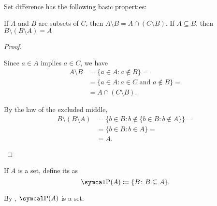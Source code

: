 \begin{proposition}\label{thm:set_difference_properties}
  Set difference has the following basic properties:
  \begin{propenum}
     If \( A \) and \( B \) are subsets of \( C \), then \( A \setminus B = A \cap (C \setminus B) \).
     If \( A \subseteq B \), then \( B \setminus (B \setminus A) = A \)
  \end{propenum}
\end{proposition}
\begin{proof}\mbox{}
  \begin{description}
     Since \( a \in A \) implies \( a \in C \), we have
    \begin{align*}
      A \setminus B
      &=
      \{ a \in A \colon a \not\in B \}
      = \\ &=
      \{ a \in A \colon a \in C \text{ and } a \not\in B \}
      = \\ &=
      A \cap (C \setminus B).
    \end{align*}

     By the law of the excluded middle,
    \begin{align*}
      B \setminus (B \setminus A)
      &=
      \{ b \in B \colon b \not\in \{ b \in B \colon b \not\in A \} \}
      = \\ &=
      \{ b \in B \colon b \in A \}
      = \\ &=
      A.
    \end{align*}
  \end{description}
\end{proof}

\begin{definition}\label{def:power_set}\cite[19]{Enderton1977}
  If \( A \) is a set, define its  as
  \begin{equation*}
    \Power(A) \coloneqq \{ B \colon B \subseteq A \}.
  \end{equation*}

  By , \( \Power(A) \) is a set.
\end{definition}

